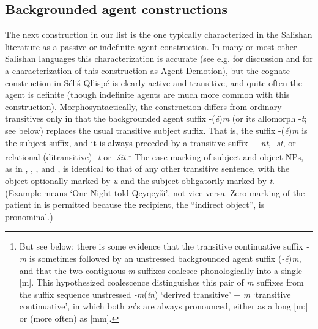\documentclass[output=paper,colorlinks,citecolor=brown]{langscibook}
\begin{document}
\subsection{Backgrounded agent constructions} %
\label{thomason_section_2.5}

The next construction in our list is the one typically characterized
in the Salishan literature as a passive or indefinite-agent
construction.  In many or most other Salishan languages this
characterization is accurate (see e.g. \citealt[25--28]{Kroeber:1999} for
discussion and for a characterization of this construction as Agent
Demotion), but the cognate construction in S\'eli\v{s}-Ql'isp\'e is
clearly active and transitive, and quite often the agent is definite
(though indefinite agents are much more common with this
construction).  Morphosyntactically, the construction differs from
ordinary transitives only in that the backgrounded agent suffix -(\emph{\'e})\emph{m} (or its allomorph -\emph{t}; see below) replaces the
usual transitive subject suffix.  That is, the suffix -(\emph{\'e})\emph{m} is the subject suffix, and it is always preceded by a transitive
suffix -- {-\emph{nt}}, -\emph{st}, or relational (ditransitive) -\emph{{\textltilde}t} or -\emph{\v{s}it}.\footnote{But see  below:
there is some evidence that the transitive continuative suffix \emph{-m} is sometimes followed by an unstressed backgrounded agent suffix
(\emph{-\'e})\emph{m}, and that the two contiguous \emph{m} suffixes
coalesce phonologically into a single [m].  This hypothesized
coalescence distinguishes this pair of \emph{m} suffixes from the
suffix sequence unstressed \emph{-m}(\emph{\'in}) `derived transitive' +
\emph{m} `transitive continuative', in which both \emph{m}'s are always
pronounced, either as a long [m:] or (more often) as [m{\textschwa}m].
} The case marking of subject and object NPs, as in , , , and
, is identical to that of any other transitive sentence, with the
object optionally marked by \emph{{\textltilde}u} and the subject
obligatorily marked by \emph{t}.  (Example  means `One-Night told
Qeyqey\v{s}i', not vice versa.  Zero marking of the patient in  is
permitted because the recipient, the ``indirect object'', is
pronominal.)
\end{document}

